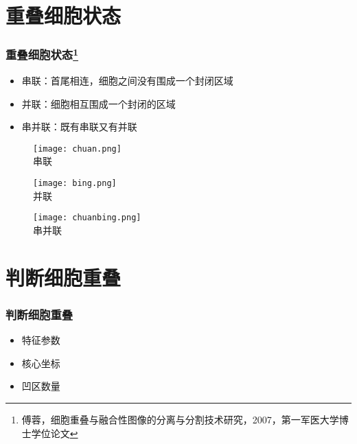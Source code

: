\documentclass[notheorems,mathserif,table,compress]{beamer}  %
\begin{document}
\section{重叠细胞状态}
\begin{frame}
  \frametitle{重叠细胞状态\footnote{傅蓉，细胞重叠与融合性图像的分离与分割技术研究，2007，第一军医大学博士学位论文}}
   \begin{itemize}
   \item 串联：首尾相连，细胞之间没有围成一个封闭区域
   \item 并联：细胞相互围成一个封闭的区域
   \item 串并联：既有串联又有并联
   \end{itemize}
   \begin{figure}
   \begin{minipage}[t]{0.3\textwidth} 
     \centering 
     \texttt{[image: chuan.png]} \\
     串联
   \end{minipage}
   \begin{minipage}[t]{0.3\textwidth} 
     \centering 
     \texttt{[image: bing.png]} \\
     并联
   \end{minipage}
   \begin{minipage}[b]{0.3\textwidth} 
     \centering 
     \texttt{[image: chuanbing.png]} \\
     串并联
   \end{minipage}
\end{figure}
\end{frame}


\section{判断细胞重叠}
\begin{frame}
  \frametitle{判断细胞重叠}
   \begin{itemize}
   \item 特征参数
   \item 核心坐标
   \item 凹区数量
   \end{itemize}
\end{frame}
\end{document}
